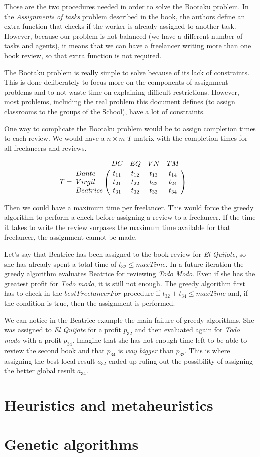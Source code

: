 Those are the two procedures needed in order to solve the Bootaku problem. In the \textit{Assignments of tasks} problem described in the book, the authors define an extra function that checks if the worker is already assigned to another task. However, because our problem is not balanced (we have a different number of tasks and agents), it means that we can have a freelancer writing more than one book review, so that extra function is not required.

The Bootaku problem is really simple to solve because of its lack of constraints. This is done deliberately to focus more on the components of assignment problems and to not waste time on explaining difficult restrictions. However, most problems, including the real problem this document defines (to assign classrooms to the groups of the School), have a lot of constraints. 

One way to complicate the Bootaku problem would be to assign completion times to each review. We would have a $n \times m$ $T$ matrix with the completion times for all freelancers and reviews.

\begin{equation}
    T = \bordermatrix{
        & DC & EQ & VN & TM \cr
        Dante & t_{11} & t_{12} & t_{13} & t_{14} \cr
        Virgil & t_{21} & t_{22} & t_{23} & t_{24} \cr
        Beatrice & t_{31} & t_{32} & t_{33} & t_{34} 
    } \qquad
\end{equation}

Then we could have a maximum time per freelancer. This would force the greedy algorithm to perform a check before assigning a review to a freelancer. If the time it takes to write the review surpases the maximum time available for that freelancer, the assignment cannot be made. 

Let's say that Beatrice has been assigned to the book review for \textit{El Quijote}, so she has already spent a total time of $t_{32} \leq maxTime$. In a future iteration the greedy algorithm evaluates Beatrice for reviewing \textit{Todo Modo}. Even if she has the greatest profit for \textit{Todo modo}, it is still not enough. The greedy algorithm first has to check in the $bestFreelancerFor$ procedure if $t_{32} + t_{34} \leq maxTime$ and, if the condition is true, then the assignment is performed. 

We can notice in the Beatrice example the main failure of greedy algorithms. She was assigned to \textit{El Quijote} for a profit $p_{32}$ and then evaluated again for \textit{Todo modo} with a profit $p_{34}$. Imagine that she has not enough time left to be able to review the second book and that $p_{34}$ is \textit{way bigger} than $p_{32}$. This is where assigning the best local result $a_{32}$ ended up ruling out the possibility of assigning the better global result $a_{34}$.



\section{Heuristics and metaheuristics}



\section{Genetic algorithms}



